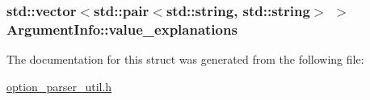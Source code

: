 \hypertarget{structArgumentInfo_a7893d5f02921816d8e10a1db35a3fe0e}{
\subsubsection[{value\-\_\-explanations}]{\setlength{\rightskip}{0pt plus 5cm}std\-::vector$<$std\-::pair$<$std\-::string, std\-::string$>$ $>$ Argument\-Info\-::value\-\_\-explanations}}\label{structArgumentInfo_a7893d5f02921816d8e10a1db35a3fe0e}


The documentation for this struct was generated from the following file\-:\begin{DoxyCompactItemize}
\item 
\hyperlink{option__parser__util_8h}{option\-\_\-parser\-\_\-util.\-h}\end{DoxyCompactItemize}
